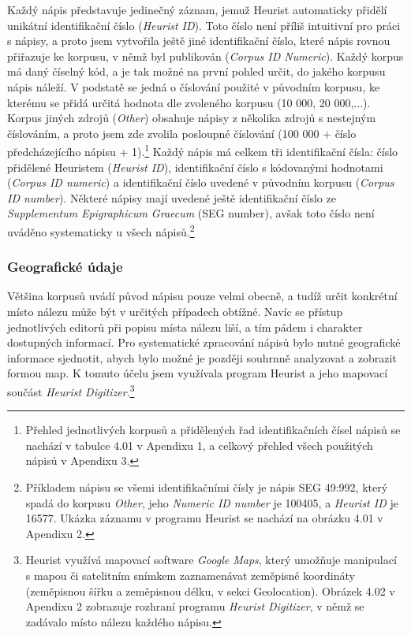 Každý nápis představuje jedinečný záznam, jemuž Heurist automaticky přidělí unikátní identifikační číslo ({\em Heurist ID}). Toto číslo není příliš intuitivní pro práci s nápisy, a proto jsem vytvořila ještě jiné identifikační číslo, které nápis rovnou přiřazuje ke korpusu, v němž byl publikován ({\em Corpus ID Numeric}). Každý korpus má daný číselný kód, a je tak možné na první pohled určit, do jakého korpusu nápis náleží. V podstatě se jedná o číslování použité v původním korpusu, ke kterému se přidá určitá hodnota dle zvoleného korpusu (10 000, 20 000,...). Korpus jiných zdrojů ({\em Other}) obsahuje nápisy z několika zdrojů s nestejným číslováním, a proto jsem zde zvolila posloupné číslování (100 000 + číslo předcházejícího nápisu + 1).\footnote{Přehled jednotlivých korpusů a přidělených řad identifikačních čísel nápisů se nachází v tabulce 4.01 v Apendixu 1, a celkový přehled všech použitých nápisů v Apendixu 3.} Každý nápis má celkem tři identifikační čísla: číslo přidělené Heuristem ({\em Heurist ID}), identifikační číslo s kódovanými hodnotami ({\em Corpus ID numeric}) a identifikační číslo uvedené v původním korpusu ({\em Corpus ID number}). Některé nápisy mají uvedené ještě identifikační číslo ze {\em Supplementum Epigraphicum Graecum} (SEG number), avšak toto číslo není uváděno systematicky u všech nápisů.\footnote{Příkladem nápisu se všemi identifikačními čísly je nápis SEG 49:992, který spadá do korpusu {\em Other}, jeho {\em Numeric ID number} je 100405, a {\em Heurist ID} je 16577. Ukázka záznamu v programu Heurist se nachází na obrázku 4.01 v Apendixu 2.}

\subsubsection[geografické-údaje]{Geografické údaje}

Většina korpusů uvádí původ nápisu pouze velmi obecně, a tudíž určit konkrétní místo nálezu může být v určitých případech obtížné. Navíc se přístup jednotlivých editorů při popisu místa nálezu liší, a tím pádem i charakter dostupných informací. Pro systematické zpracování nápisů bylo nutné geografické informace sjednotit, abych bylo možné je později souhrnně analyzovat a zobrazit formou map. K tomuto účelu jsem využívala program Heurist a jeho mapovací součást {\em Heurist Digitizer}.\footnote{Heurist využívá mapovací software {\em Google Maps}, který umožňuje manipulací s mapou či satelitním snímkem zaznamenávat zeměpisné koordináty (zeměpisnou šířku a zeměpisnou délku, v sekci Geolocation). Obrázek 4.02 v Apendixu 2 zobrazuje rozhraní programu {\em Heurist Digitizer}, v němž se zadávalo místo nálezu každého nápisu.}

